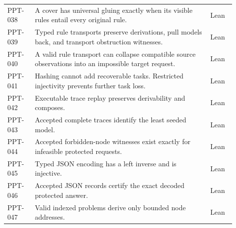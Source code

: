 \documentclass[11pt,oneside]{article}
\theoremstyle{komorebiplain}
\theoremstyle{komorebidefinition}
\theoremstyle{komorebiremark}
\begin{document}
\begin{longtable}{@{}L{0.115\linewidth}L{0.70\linewidth}L{0.105\linewidth}@{}}
PPT-038 & A cover has universal gluing exactly when its visible rules entail every original rule. & {\sffamily\small\color{KomorebiTeal}Lean}\\[0pt]
PPT-039 & Typed rule transports preserve derivations, pull models back, and transport obstruction witnesses. & {\sffamily\small\color{KomorebiTeal}Lean}\\[0pt]
PPT-040 & A valid rule transport can collapse compatible source observations into an impossible target request. & {\sffamily\small\color{KomorebiTeal}Lean}\\[0pt]
PPT-041 & Hashing cannot add recoverable tasks. Restricted injectivity prevents further task loss. & {\sffamily\small\color{KomorebiTeal}Lean}\\[0pt]
PPT-042 & Executable trace replay preserves derivability and composes. & {\sffamily\small\color{KomorebiTeal}Lean}\\[0pt]
PPT-043 & Accepted complete traces identify the least seeded model. & {\sffamily\small\color{KomorebiTeal}Lean}\\[0pt]
PPT-044 & Accepted forbidden-node witnesses exist exactly for infeasible protected requests. & {\sffamily\small\color{KomorebiTeal}Lean}\\[0pt]
PPT-045 & Typed JSON encoding has a left inverse and is injective. & {\sffamily\small\color{KomorebiTeal}Lean}\\[0pt]
PPT-046 & Accepted JSON records certify the exact decoded protected answer. & {\sffamily\small\color{KomorebiTeal}Lean}\\[0pt]
PPT-047 & Valid indexed problems derive only bounded node addresses. & {\sffamily\small\color{KomorebiTeal}Lean}\\[0pt]
\end{longtable}
\renewcommand{\arraystretch}{1.0}
\endgroup
\end{document}
